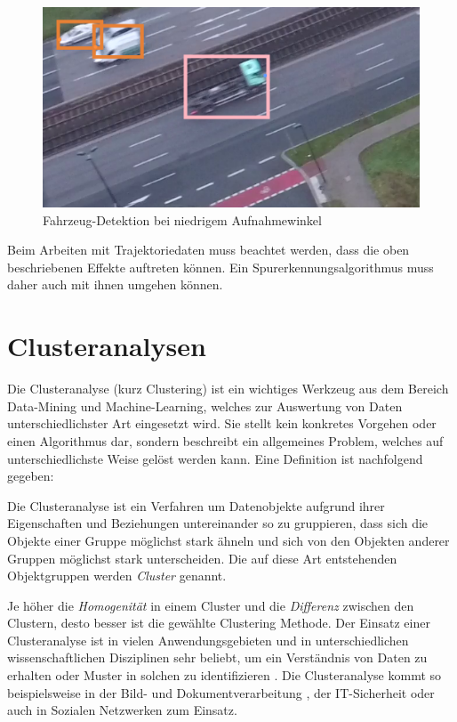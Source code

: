 \begin{figure}[H]
    \centering
    \includegraphics[width=0.45\linewidth]{resources/img/grundlagen/TrajectoryReconstruction/challenges/low_angle}
    \caption{Fahrzeug-Detektion bei niedrigem Aufnahmewinkel}
    \label{fig:grund_low_angle_detection}
\end{figure}

Beim Arbeiten mit Trajektoriedaten muss beachtet werden, dass die oben beschriebenen Effekte auftreten
können. Ein Spurerkennungsalgorithmus muss daher auch mit ihnen umgehen können.



\chapter{Clusteranalysen}
\label{sec:tra_clustering}

Die Clusteranalyse (kurz Clustering) ist ein wichtiges Werkzeug aus dem Bereich Data-Mining und Machine-Learning,
welches zur Auswertung von Daten unterschiedlichster Art eingesetzt wird.
Sie stellt kein konkretes Vorgehen oder einen Algorithmus dar, sondern beschreibt ein
allgemeines Problem, welches auf unterschiedlichste Weise gelöst werden kann. Eine Definition ist nachfolgend
gegeben:

\begin{theorem}[Clusteranalyse]
    Die Clusteranalyse ist ein Verfahren um Datenobjekte aufgrund ihrer Eigenschaften und Beziehungen
    untereinander so zu gruppieren, dass sich die Objekte einer Gruppe möglichst stark ähneln und sich
    von den Objekten anderer Gruppen möglichst stark unterscheiden. Die auf diese Art entstehenden
    Objektgruppen werden \textit{Cluster} genannt.
\end{theorem}

Je höher die \textit{Homogenität} in einem Cluster
und die \textit{Differenz} zwischen den Clustern, desto besser ist die gewählte Clustering Methode.
Der Einsatz einer Clusteranalyse ist in vielen Anwendungsgebieten und in unterschiedlichen wissenschaftlichen
Disziplinen sehr beliebt, um ein Verständnis von Daten zu erhalten oder Muster in solchen zu identifizieren \cite[]{tan2007introduction}.
Die Clusteranalyse kommt so beispielsweise in der Bild- \cite[]{Pappas1992} und Dokumentverarbeitung \cite[]{Hammouda2004},
der IT-Sicherheit \cite[]{Portnoy2001} oder auch in Sozialen Netzwerken \cite[]{Handcock2007} zum Einsatz.

